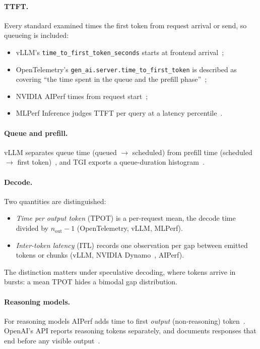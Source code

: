 \documentclass[11pt]{article}
\begin{document}
\paragraph{TTFT.} Every standard examined times the first token from request arrival or send, so
queueing is included:
\begin{itemize}
\item vLLM's \texttt{time\_to\_first\_token\_seconds} starts at frontend arrival~\citep{vllm_metrics};
\item OpenTelemetry's \texttt{gen\_ai.server.time\_to\_first\_token} is described as covering ``the
time spent in the queue and the prefill phase''~\citep{otel_genai_metrics};
\item NVIDIA AIPerf times from request start~\citep{nvidia_aiperf};
\item MLPerf Inference judges TTFT per query at a latency percentile~\citep{mlperf_rules}.
\end{itemize}

\paragraph{Queue and prefill.} vLLM separates queue time (queued $\to$ scheduled) from prefill time
(scheduled $\to$ first token)~\citep{vllm_metrics}, and TGI exports a queue-duration
histogram~\citep{tgi_metrics}.

\paragraph{Decode.} Two quantities are distinguished:
\begin{itemize}
\item \emph{Time per output token} (TPOT) is a per-request mean, the decode time divided by
$n_\text{out}-1$ (OpenTelemetry, vLLM, MLPerf).
\item \emph{Inter-token latency} (ITL) records one observation per gap between emitted tokens or
chunks (vLLM, NVIDIA Dynamo~\citep{nvidia_dynamo}, AIPerf).
\end{itemize}
The distinction matters under speculative decoding, where tokens arrive in bursts: a mean TPOT hides
a bimodal gap distribution.

\paragraph{Reasoning models.} For reasoning models AIPerf adds time to first \emph{output}
(non-reasoning) token~\citep{nvidia_aiperf}. OpenAI's API reports reasoning tokens separately, and
documents responses that end before any visible output~\citep{openai_reasoning}.
\end{document}
